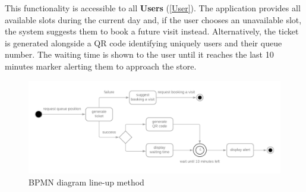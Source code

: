 \documentclass[table, 12pt]{article}
\begin{document}
This functionality is accessible to all \textbf{Users} (\ref{User}). The application provides all available slots during the current day and, if the user chooses an unavailable slot, the system suggests them to book a future visit instead.
Alternatively, the ticket is generated alongside a QR code identifying uniquely users and their queue number. The waiting time is shown to the user until it reaches the last 10 minutes marker alerting them to approach the store.
\begin{figure}[!htb]
    \begin{center}
        \includegraphics[scale=0.29]{assets/function-line-up.png}
        \caption{BPMN diagram line-up method}
    \end{center}
\end{figure}
\end{document}
